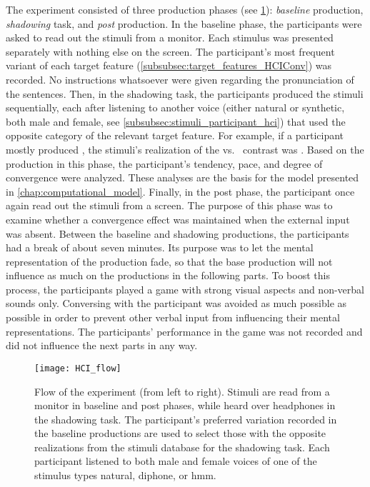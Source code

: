 The experiment consisted of three production phases (see \cref{fig:HCIConvFlow}): \emph{baseline} production, \emph{shadowing} task, and \emph{post} production.
In the baseline phase, the participants were asked to read out the stimuli from a monitor.
Each stimulus was presented separately with nothing else on the screen.
The participant's most frequent variant of each target feature (\cref{subsubsec:target_features_HCIConv}) was recorded.
No instructions whatsoever were given regarding the pronunciation of the sentences.
Then, in the shadowing task, the participants produced the stimuli sequentially, each after listening to another voice (either natural or synthetic, both male and female, see \cref{subsubsec:stimuli_participant_hci}) that used the opposite category of the relevant target feature.
For example, if a participant mostly produced \textipa{[\c{c}]}, the stimuli's realization of the \textipa{[\c{c}]} vs.\ \textipa{[k]} contrast was \textipa{[k]}.
Based on the production in this phase, the participant's tendency, pace, and degree of convergence were analyzed.
These analyses are the basis for the model presented in \cref{chap:computational_model}.
Finally, in the post phase, the participant once again read out the stimuli from a screen.
The purpose of this phase was to examine whether a convergence effect was maintained when the external input was absent.
Between the baseline and shadowing productions, the participants had a break of about seven minutes.
Its purpose was to let the mental representation of the production fade, so that the base production will not influence as much on the productions in the following parts.
To boost this process, the participants played a game with strong visual aspects and non-verbal sounds only.
Conversing with the participant was avoided as much possible as possible in order to prevent other verbal input from influencing their mental representations.
The participants' performance in the game was not recorded and did not influence the next parts in any way.
%
\begin{figure}[t]
	\centering
	\texttt{[image: HCI\_flow]}
	\caption[\acs{hci} convergence experiment workflow]
		{Flow of the experiment (from left to right).
		Stimuli are read from a monitor in baseline and post phases, while heard over headphones in the shadowing task.
		The participant's preferred variation recorded in the baseline productions are used to select those with the opposite realizations from the stimuli database for the shadowing task.
		Each participant listened to both male and female voices of one of the stimulus types natural, diphone, or \acs{hmm}.}
	\label{fig:HCIConvFlow}
\end{figure}
